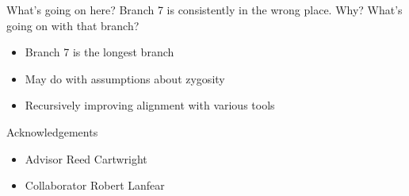 \documentclass{beamer}
\begin{document}
\begin{frame}{What's going on here?}
Branch 7 is consistently in the wrong place. Why? What's going on with that branch?
\begin{itemize}
\item Branch 7 is the longest branch
\item May do with assumptions about zygosity
\item Recursively improving alignment with various tools
\end{itemize}
\end{frame}

\begin{frame}{Acknowledgements}
\begin{itemize}
\item Advisor Reed Cartwright
\item Collaborator Robert Lanfear
\end{itemize}
\end{frame}

\end{document}
